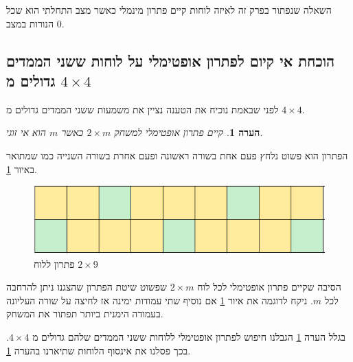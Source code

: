 \documentclass[12pt,leqno]{article}
\theoremstyle{theoremdd}
\newtheorem{comm}{הערה}[section]
\begin{document}
השאלה שנפתור בפרק זה לאיזה לוחות קיים פתרון מינמלי כאשר מצב התחלתי הוא שכל הנורות במצב
$0$.

\subsection{הוכחת אי קיום לפתרון אופטימלי על לוחות ששני הממדים גדולים מ
\texorpdfstring{$4 \times 4$}{4 x 4}}
לפני שבאמת נוכיח את הטענה 
נציין את משמעות ששני הממדים גדולים מ
$4 \times 4$.
\begin{comm}
    \label{comm:sol to 2 x m}
    קיים פתרון אופטימלי למשחק 
    $2 \times m$
    כאשר 
    $m$
    הוא אי זוגי.
\end{comm}
הפתרון הוא פשוט נלחץ פעם אחת בשורה ראשונה ופעם אחרת בשורה השנייה כמו שמתואר באיור 
\ref{fig: 2x9 have min sol}.

\begin{figure}[ht]
    \caption{פתרון ללוח 
    $2 \times 9$}
    \label{fig: 2x9 have min sol}
    \centering
    \includegraphics[width=.5\textwidth,keepaspectratio]{images/2xm_sol.PNG}
\end{figure}

הסיבה שקיים פתרון אופטימלי לכל לוח 
$2 \times m$
שפשוט שיטת הפתרון שהצגנו ניתן להרחבה לכל 
$m$.
ניקח לדוגמה את איור 
\ref{fig: 2x9 have min sol}
אם נוסיף שתי עמודות ימינה 
אז לחיצה על שורה העליונה 
בעמודה הימנית ביותר תפתור את המשחק.

בגלל הערה 
\ref{comm:sol to 2 x m}
הגבלנו חיפוש לפתרון אופטימלי ללוחות 
ששני הממדים שלהם גדולים מ
$4 \times 4$.
בכך פסלנו את אינסוף הלוחות שתיארנו בהערה 
\ref{comm:sol to 2 x m}.
\end{document}
